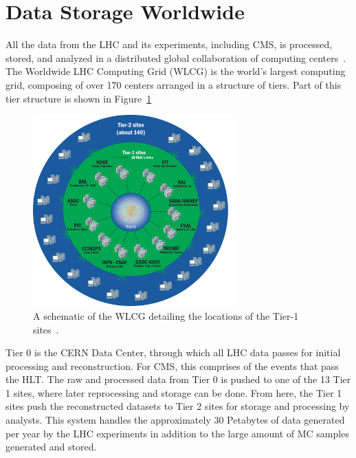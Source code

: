 \section{Data Storage Worldwide\label{sec:storage}}

All the data from the LHC and its experiments, including CMS, is processed, stored, and analyzed
in a distributed global collaboration of computing centers~\cite{Eck:840543}. The Worldwide
LHC Computing Grid (WLCG) is the world's largest computing grid, composing of over 170 centers
arranged in a structure of tiers. Part of this tier structure is shown in Figure~\ref{fig:cerncomputing}

\begin{figure}[ht]
 \begin{center}
    \includegraphics[width=0.70\textwidth]{figures/data/CCApr13-Tiers0-1-2_PNG-file.pdf}
      \end{center}
\caption{A schematic of the WLCG detailing the locations of the Tier-1 sites~\cite{cern:computing}.}
\label{fig:cerncomputing}
\end{figure}

Tier 0 is the CERN Data Center, through which all LHC data passes for initial processing and
reconstruction. For CMS, this comprises of the events that pass the HLT.
The raw and processed data from Tier 0 is pushed to one of the 13 Tier 1 sites, where
later reprocessing and storage can be done. From here, the Tier 1 sites push the reconstructed
datasets to Tier 2 sites for storage and processing by analysts. This system handles the approximately
30 Petabytes of data generated per year by the LHC experiments in addition to the large amount of
MC samples generated and stored.

